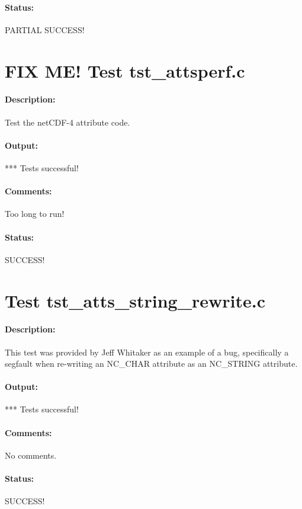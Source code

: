 \paragraph{Status:} PARTIAL SUCCESS!

\section{FIX ME! Test tst\_attsperf.c}

\paragraph{Description:} Test the netCDF-4 attribute code.

\paragraph{Output:} *** Tests successful!

\paragraph{Comments:} Too long to run!

\paragraph{Status:} SUCCESS!

\section{Test tst\_atts\_string\_rewrite.c}

\paragraph{Description:} This test was provided by Jeff Whitaker as an example of a bug,
specifically a segfault when re-writing an NC\_CHAR attribute as
an NC\_STRING attribute.

\paragraph{Output:} *** Tests successful!

\paragraph{Comments:} No comments.

\paragraph{Status:} SUCCESS!

